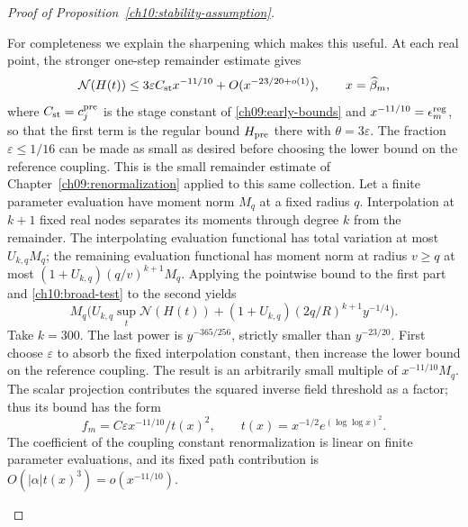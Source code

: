 \begin{proof}[Proof of Proposition~\ref{ch10:stability-assumption}]
\begin{enumerate}[label=\emph{Step \arabic*.},ref=\arabic*,leftmargin=*,align=left]
For completeness we explain the sharpening which makes this useful.
At each real point, the stronger one-step remainder estimate gives
\[
 \mathcal N(H(t))\le 3\varepsilon C_{\rm st}x^{-11/10}
                         +O(x^{-23/20+o(1)}),\qquad
 x=\widehat\beta_m,
\]
where $C_{\rm st}=c_j^{\rm pre}$ is the stage constant of \eqref{ch09:early-bounds} and $x^{-11/10}=\epsilon_m^{\rm reg}$, so that the first term is the regular bound $H_{\rm pre}$ there with $\theta=3\varepsilon$. The fraction $\varepsilon\le1/16$ can be made as
small as desired before choosing the lower bound on the reference coupling. This is the
small remainder estimate of Chapter~\ref{ch09:renormalization}
applied to this same collection.
Let a finite parameter evaluation have moment norm $M_q$ at a fixed radius $q$.
Interpolation at $k+1$ fixed real nodes separates its moments through
degree $k$ from the remainder. The interpolating evaluation functional has total
variation at most $U_{k,q}M_q$; the remaining evaluation functional has moment norm
at radius $v\ge q$ at most
$(1+U_{k,q})(q/v)^{k+1}M_q$. Applying the pointwise bound to the
first part and \eqref{ch10:broad-test} to the second yields
\[
 M_q\bigl(U_{k,q}\sup_t\mathcal N(H(t))
             +(1+U_{k,q})(2q/R)^{k+1}y^{-1/4}\bigr).
\]
Take $k=300$. The last power is $y^{-365/256}$, strictly smaller
than $y^{-23/20}$. First choose $\varepsilon$ to absorb the fixed
interpolation constant, then increase the lower bound on the reference coupling. The
result is an arbitrarily small multiple of $x^{-11/10}M_q$.
The scalar projection contributes the squared inverse field threshold as a factor;
thus its bound has the form
\[
 f_m=C\varepsilon x^{-11/10}/t(x)^2,
 \qquad t(x)=x^{-1/2}e^{(\log\log x)^2}.
\]
The coefficient of the coupling constant renormalization is linear on finite parameter evaluations, and its fixed path contribution
is $O(|\alpha|t(x)^3)=o(x^{-11/10})$.


\end{enumerate}
\end{proof}
